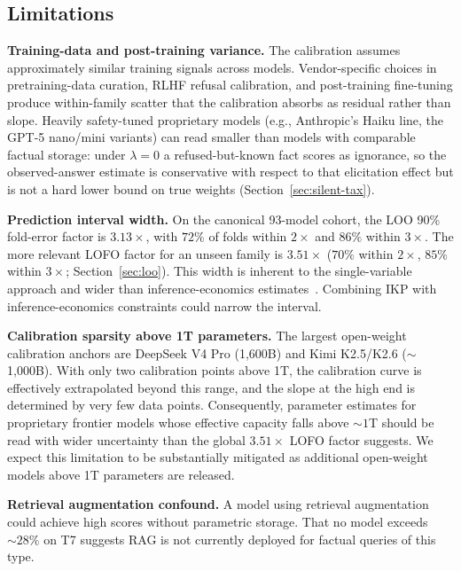 \documentclass[11pt]{article}
\begin{document}
\subsection{Limitations}
\label{sec:limitations}

\textbf{Training-data and post-training variance.} The calibration assumes approximately similar training signals across models. Vendor-specific choices in pretraining-data curation, RLHF refusal calibration, and post-training fine-tuning produce within-family scatter that the calibration absorbs as residual rather than slope. Heavily safety-tuned proprietary models (e.g., Anthropic's Haiku line, the GPT-5 nano/mini variants) can read smaller than models with comparable factual storage: under $\lambda=0$ a refused-but-known fact scores as ignorance, so the observed-answer estimate is conservative with respect to that elicitation effect but is not a hard lower bound on true weights (Section~\ref{sec:silent-tax}).

\textbf{Prediction interval width.} On the canonical 93-model cohort, the LOO 90\% fold-error factor is $3.13\times$, with $72\%$ of folds within $2\times$ and $86\%$ within $3\times$. The more relevant LOFO factor for an unseen family is $3.51\times$ ($70\%$ within $2\times$, $85\%$ within $3\times$; Section~\ref{sec:loo}). This width is inherent to the single-variable approach and wider than inference-economics estimates~\citep{epochai2024}. Combining IKP with inference-economics constraints could narrow the interval.

\textbf{Calibration sparsity above 1T parameters.} The largest open-weight calibration anchors are DeepSeek V4 Pro (1{,}600B) and Kimi K2.5/K2.6 ($\sim$1{,}000B). With only two calibration points above 1T, the calibration curve is effectively extrapolated beyond this range, and the slope at the high end is determined by very few data points. Consequently, parameter estimates for proprietary frontier models whose effective capacity falls above ${\sim}1$T should be read with wider uncertainty than the global $3.51\times$ LOFO factor suggests. We expect this limitation to be substantially mitigated as additional open-weight models above 1T parameters are released.

\textbf{Retrieval augmentation confound.} A model using retrieval augmentation~\citep{lewis2020retrieval} could achieve high scores without parametric storage. That no model exceeds ${\sim}28\%$ on T7 suggests RAG is not currently deployed for factual queries of this type.
\end{document}
